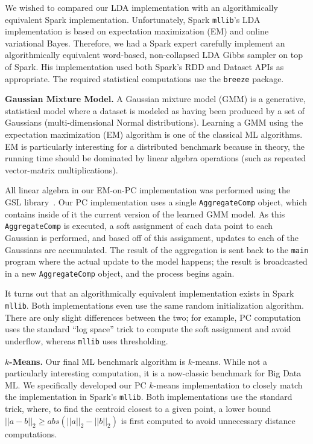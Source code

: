 We wished to compared our LDA implementation with an algorithmically equivalent Spark implementation.  Unfortunately,
Spark \texttt{mllib}'s LDA implementation is based on expectation
maximization (EM) and online variational Bayes.
Therefore, we had a Spark expert 
carefully implement an algorithmically
equivalent word-based, non-collapsed LDA Gibbs sampler on top of Spark.  His implementation used both
Spark's RDD and Dataset        
APIs as appropriate.
The required statistical computations use the
\texttt{breeze} package. 


\vspace{5pt}
\noindent
\textbf{Gaussian Mixture Model.} A Gaussian mixture model (GMM) is a generative, statistical model where a dataset is modeled
as having been produced by a set of Gaussians (multi-dimensional Normal distributions). Learning a GMM using
the expectation maximization (EM) algorithm is one of the classical ML algorithms.
EM is particularly interesting for a distributed benchmark because in theory, the running time should be dominated
by linear algebra operations (such as repeated vector-matrix multiplications).

All linear algebra in our EM-on-PC implementation was performed using
the GSL library~\cite{gsl}.  
Our PC implementation uses a single \texttt{AggregateComp} object, which contains inside of it the current
version of the learned GMM model.  As this  \texttt{AggregateComp} is executed, a soft assignment of each
data point to each Gaussian is performed, and based off of this assignment, updates to each of the Gaussians
are accumulated.  The result of the aggregation is sent back to the \texttt{main} program where the actual update
to the model happens; the result is broadcasted in a new \texttt{AggregateComp} object, and the process begins again.

It turns out that an algorithmically equivalent implementation exists in Spark \texttt{mllib}.
Both implementations even use the same random initialization algorithm.
There are only slight differences between the two; for example, PC computation uses the standard ``log space'' trick to
compute the soft assignment and avoid underflow, whereas \texttt{mllib} uses thresholding.  

\vspace{5pt}
\noindent
\textbf{$k$-Means.} Our final ML benchmark algorithm is $k$-means.  
While not a particularly interesting computation, it is a now-classic
benchmark for Big Data ML.  We specifically developed our PC $k$-means implementation to closely match
the implementation in Spark's \texttt{mllib}.
Both implementations use the standard trick, where, to find the centroid closest to a given point,
a lower bound $||a - b||_2 \geq  abs(||a||_2 - ||b||_2)$ is
first computed to avoid unnecessary distance computations. 

